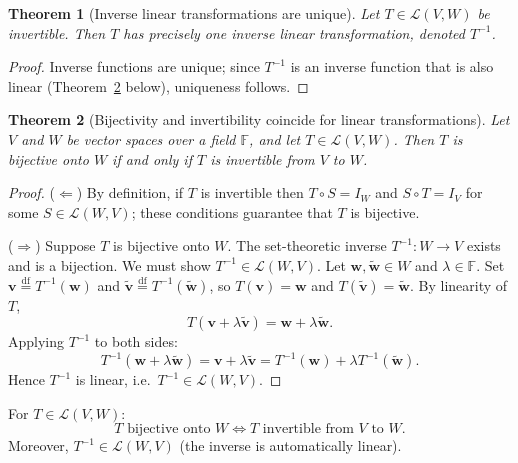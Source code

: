 \documentclass[11pt, a4paper, notitlepage]{report}
\newtheorem{theorem}{Theorem}[section]
\theoremstyle{definition}
\theoremstyle{remark}
\begin{document}
\begin{theorem}[Inverse linear transformations are unique]
\label{thm:inverse-unique}
Let $T \in \mathcal{L}(V,W)$ be invertible.  Then $T$ has precisely one inverse linear
transformation, denoted $T^{-1}$.
\end{theorem}

\begin{proof}
Inverse functions are unique; since $T^{-1}$ is an inverse function that is also linear
(Theorem~\ref{thm:bijective-iff-invertible} below), uniqueness follows.
\end{proof}

\begin{theorem}[Bijectivity and invertibility coincide for linear transformations]
\label{thm:bijective-iff-invertible}
Let $V$ and $W$ be vector spaces over a field $\mathbb{F}$, and let $T \in \mathcal{L}(V,W)$.
Then $T$ is bijective onto $W$ if and only if $T$ is invertible from $V$ to $W$.
\end{theorem}

\begin{proof}
($\Leftarrow$) By definition, if $T$ is invertible then $T \circ S = I_W$ and $S \circ T =
I_V$ for some $S \in \mathcal{L}(W,V)$; these conditions guarantee that $T$ is bijective.

($\Rightarrow$) Suppose $T$ is bijective onto $W$.  The set-theoretic inverse $T^{-1}: W \to
V$ exists and is a bijection.  We must show $T^{-1} \in \mathcal{L}(W,V)$.  Let
$\mathbf{w}, \tilde{\mathbf{w}} \in W$ and $\lambda \in \mathbb{F}$.  Set $\mathbf{v}
\stackrel{\mathrm{df}}{=} T^{-1}(\mathbf{w})$ and $\tilde{\mathbf{v}} \stackrel{\mathrm{df}}{=}
T^{-1}(\tilde{\mathbf{w}})$, so $T(\mathbf{v}) = \mathbf{w}$ and $T(\tilde{\mathbf{v}}) =
\tilde{\mathbf{w}}$.  By linearity of $T$,
\[
  T(\mathbf{v} + \lambda\tilde{\mathbf{v}}) = \mathbf{w} + \lambda\tilde{\mathbf{w}}.
\]
Applying $T^{-1}$ to both sides:
\[
  T^{-1}(\mathbf{w} + \lambda\tilde{\mathbf{w}}) = \mathbf{v} + \lambda\tilde{\mathbf{v}}
  = T^{-1}(\mathbf{w}) + \lambda T^{-1}(\tilde{\mathbf{w}}).
\]
Hence $T^{-1}$ is linear, i.e.\ $T^{-1} \in \mathcal{L}(W,V)$.
\end{proof}

\begin{keyresult}[title={Key Result: Bijective $\iff$ Invertible (for Linear Transformations)}]
For $T \in \mathcal{L}(V,W)$:
\[
  T \text{ bijective onto } W \iff T \text{ invertible from } V \text{ to } W.
\]
Moreover, $T^{-1} \in \mathcal{L}(W, V)$ (the inverse is automatically linear).
\end{keyresult}
\end{document}
